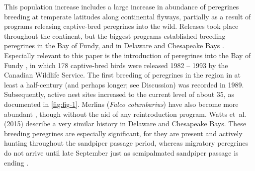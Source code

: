 This population increase includes a large increase in abundance of peregrines breeding at temperate latitudes along continental flyways, partially as a result of programs releasing captive-bred peregrines into the wild.  Releases took place throughout the continent, but the biggest programs established breeding peregrines in the Bay of Fundy, and in Delaware and Chesapeake Bays \citep[and environs; ][]{amirault20041995,Gahbauer2015,Watts2015}. Especially relevant to this paper is the introduction of peregrines into the Bay of Fundy \citep[summarized in ][]{Dekker2011}, in which 178 captive-bred birds were released 1982 -- 1993 by the Canadian Wildlife Service. The first breeding of peregrines in the region in at least a half-century (and perhaps longer; see Discussion) was recorded in 1989. Subsequently, active nest sites increased to the current level of about 35, as documented in \autoref{fig:fig-1}. Merlins (\textit{Falco columbarius}) have also become more abundant \citep{Dekker2011}, though without the aid of any reintroduction program. Watts et al. (2015) describe a very similar history in Delaware and Chesapeake Bays.  These breeding peregrines are especially significant, for they are present and actively hunting \citep{Dekker2011} throughout the sandpiper passage period, whereas migratory peregrines do not arrive until late September just as semipalmated sandpiper passage is ending \citep[see Figure 5 in ][]{lank_effects_2003}. 

